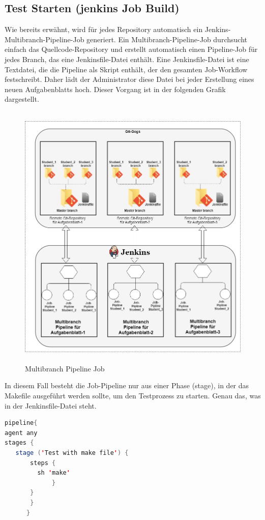\documentclass[a4paper,12pt,oneside]{book}
\begin{document}
\subsection{Test Starten (jenkins Job Build)}
Wie bereits erwähnt, wird für jedes Repository automatisch ein Jenkins-Multibranch-Pipeline-Job generiert. Ein Multibranch-Pipeline-Job durchsucht einfach das Quellcode-Repository und erstellt automatisch einen Pipeline-Job für jedes Branch, das eine Jenkinsfile-Datei enthält. 
\newline
Eine Jenkinsfile-Datei ist eine Textdatei, die die Pipeline als Skript enthält, der den gesamten Job-Workflow festschreibt. Daher lädt der Administrator diese Datei bei jeder Erstellung eines neuen Aufgabenblatts hoch. Dieser Vorgang ist in der folgenden Grafik dargestellt.
\begin{figure}[h!]
	\begin{center}
		\includegraphics[width=13cm, height=13cm]{GogsJenkins.jpg}
		\caption{Multibranch Pipeline Job} 
		\label{ Multibranch Pipeline Job } 
	\end{center}
\end{figure}
\newpage
In diesem Fall besteht die Job-Pipeline nur aus einer Phase (stage), in der das Makefile ausgeführt werden sollte, um den Testprozess zu starten. Genau das, was in der Jenkinsfile-Datei steht.
\begin{lstlisting}[language=JAVA,caption=Jenkinsfile (Job-Pipeline-Skript) ]
pipeline{
agent any
stages {   
   stage ('Test with make file') {
       steps {
         sh 'make'
             }
       }
       }
      }
\end{lstlisting} 
\end{document}
